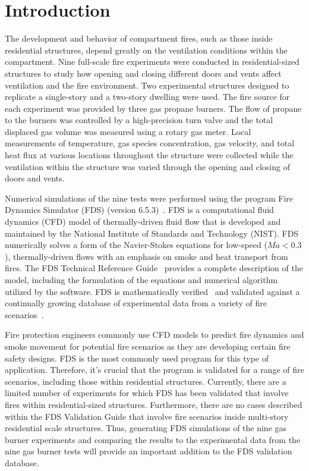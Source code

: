 
\renewcommand{\thechapter}{1}

\chapter{Introduction}
The development and behavior of compartment fires, such as those inside residential structures, depend greatly on the ventilation conditions within the compartment. Nine full-scale fire experiments were conducted in residential-sized structures to study how opening and closing different doors and vents affect ventilation and the fire environment. Two experimental structures designed to replicate a single-story and a two-story dwelling were used. The fire source for each experiment was provided by three gas propane burners. The flow of propane to the burners was controlled by a high-precision turn valve and the total displaced gas volume was measured using a rotary gas meter. Local measurements of temperature, gas species concentration, gas velocity, and total heat flux at various locations throughout the structure were collected while the ventilation within the structure was varied through the opening and closing of doors and vents. 


Numerical simulations of the nine tests were performed using the program Fire Dynamics Simulator (FDS) (version 6.5.3)~\cite{FDS_Users_Guide}. FDS is a computational fluid dynamics (CFD) model of thermally-driven fluid flow that is developed and maintained by the National Institute of Standards and Technology (NIST). FDS numerically solves a form of the Navier-Stokes equations for low-speed ($Ma < 0.3$), thermally-driven flows with an emphasis on smoke and heat transport from fires. The FDS Technical Reference Guide~\cite{FDS_Tech_Guide} provides a complete description of the model, including the formulation of the equations and numerical algorithm utilized by the software. FDS is mathematically verified~\cite{FDS_Verification_Guide} and validated against a continually growing database of experimental data from a variety of fire scenarios~\cite{FDS_Validation_Guide}.

Fire protection engineers commonly use CFD models to predict fire dynamics and smoke movement for potential fire scenarios as they are developing certain fire safety designs. FDS is the most commonly used program for this type of application. Therefore, it's crucial that the program is validated for a range of fire scenarios, including those within residential structures. Currently, there are a limited number of experiments for which FDS has been validated that involve fires within residential-sized structures. Furthermore, there are no cases described within the FDS Validation Guide that involve fire scenarios inside multi-story residential scale structures. Thus, generating FDS simulations of the nine gas burner experiments and comparing the results to the experimental data from the nine gas burner tests will provide an important addition to the FDS validation database.

